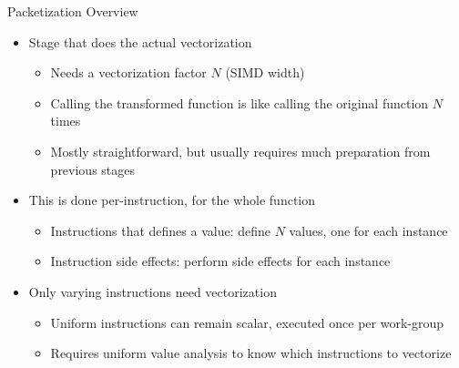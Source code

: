 \begin{frame}{Packetization Overview}

\begin{itemize}
    \item Stage that does the actual vectorization
    \begin{itemize}
        \item Needs a vectorization factor $N$ (SIMD width)
        \item Calling the transformed function is like calling the original function $N$ times
        \item Mostly straightforward, but usually requires much preparation from previous stages
    \end{itemize}
    
    \item This is done per-instruction, for the whole function
    \begin{itemize}
        \item Instructions that defines a value: define $N$ values, one for each instance
        \item Instruction side effects: perform side effects for each instance
    \end{itemize}
    
    \item Only varying instructions need vectorization
    \begin{itemize}
        \item Uniform instructions can remain scalar, executed once per work-group
        \item Requires uniform value analysis to know which instructions to vectorize
    \end{itemize}
    
\end{itemize}

\end{frame}


